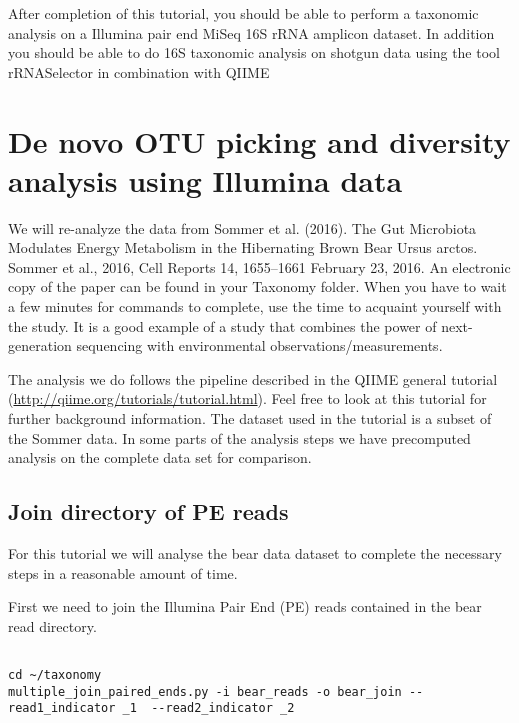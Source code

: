 After completion of this tutorial, you should be able to perform a taxonomic analysis on a Illumina pair end MiSeq 16S rRNA amplicon dataset. In addition you should be able to do 16S taxonomic analysis on shotgun data using the tool rRNASelector in combination with QIIME


\section{De novo OTU picking and diversity analysis using Illumina data}

We will re-analyze the data from Sommer et al. (2016). The Gut Microbiota Modulates Energy Metabolism in the Hibernating Brown Bear Ursus arctos. Sommer et al., 2016, Cell Reports 14, 1655–1661 February 23, 2016. An electronic copy of the paper can be found in your Taxonomy folder. When you have to wait a few minutes for commands to complete, use the time to acquaint yourself with the study. It is a good example of a study that combines the power of next-generation sequencing with environmental observations/measurements.

The analysis we do follows the pipeline described in the QIIME general tutorial (\url{http://qiime.org/tutorials/tutorial.html}). Feel free to look at this tutorial for further background information. The dataset used in the tutorial is a subset of the Sommer data. In some parts of the analysis steps we have precomputed analysis on the complete data set for comparison. 

\subsection{Join directory of PE reads}

\begin{information}
For this tutorial we will analyse the bear data dataset to complete the necessary steps in a reasonable amount of time.
\end{information}

\begin{steps}

First we need to join the Illumina Pair End (PE) reads contained in the bear read directory.

\begin{lstlisting}

cd ~/taxonomy
multiple_join_paired_ends.py -i bear_reads -o bear_join --read1_indicator _1  --read2_indicator _2

\end{lstlisting}

\end{steps}

